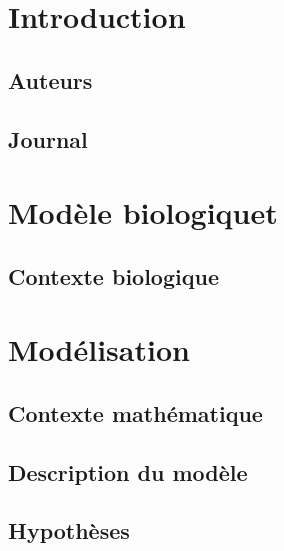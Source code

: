 \documentclass[fleqn,10pt]{SelfArx}
\begin{document}
\flushbottom %

\maketitle %

\thispagestyle{empty} %


\section*{Introduction} 

\subsection*{Auteurs}
\subsection*{Journal}  

\section*{Modèle biologiquet}



\subsection*{Contexte biologique}
\section*{Modélisation}
\subsection*{Contexte mathématique}
\subsection*{Description du modèle} %
\subsection*{Hypothèses} %
\end{document}
